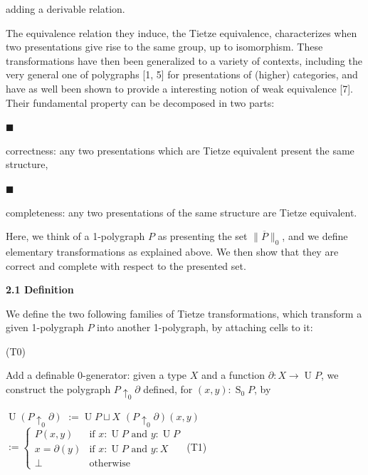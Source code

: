 \documentclass[10pt,a4paper]{amsart}
\begin{document}
adding a derivable relation.\par
 
   
The equivalence relation they induce, the Tietze equivalence, characterizes when two presentations give rise to the same group, up to isomorphism. These transformations have then been generalized to a variety of contexts, including the very general one of polygraphs [1, 5] for presentations of (higher) categories, and have as well been shown to provide a interesting notion of weak equivalence [7]. Their fundamental property can be decomposed in two parts:\par
  
\par\noindent  $\blacksquare$ 
 
correctness: any two presentations which are Tietze equivalent present the same structure,\par
 
 
 
\par\noindent  $\blacksquare$ 
 
completeness: any two presentations of the same structure are Tietze equivalent.\par
 
 
  
Here, we think of a 1-polygraph $P$ as presenting the set $\|\overline{P}\|_{0}$, and we define elementary transformations as explained above. We then show that they are correct and complete with respect to the presented set.\par
 
 
 
\par\medskip\noindent\textbf{2.1 Definition}\par
 
 
We define the two following families of Tietze transformations, which transform a given 1-polygraph $P$ into another 1-polygraph, by attaching cells to it:\par
  (T0)  
 
Add a definable 0-generator: given a type $X$ and a function $\partial:X\to\operatorname{U}P$, we construct the polygraph $P{\uparrow_{0}}\partial$ defined, for $(x,y):\operatorname{S}_{0}P$, by\par
    $\displaystyle\operatorname{U}(P{\uparrow_{0}}\partial)$ $\displaystyle:=\operatorname{U}P\sqcup X$ $\displaystyle(P{\uparrow_{0}}\partial)(x,y)$ $\displaystyle:=\begin{cases}P(x,y)&\text{if $x:\operatorname{U}P$ and $y:\operatorname{U}P$}\\
x=\partial(y)&\text{if $x:\operatorname{U}P$ and $y:X$}\\
\bot&\text{otherwise}\end{cases}$    
  (T1)  
 
\end{document}
